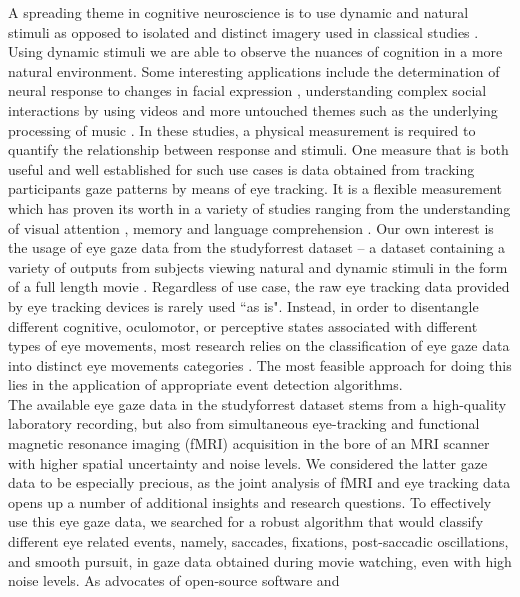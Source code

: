     A spreading theme in cognitive neuroscience is to use dynamic and natural stimuli as opposed to isolated and distinct
    imagery used in classical studies \citep{real_world}. Using dynamic stimuli we are able to observe the nuances of
    cognition in a more natural environment. Some interesting applications include the determination of neural response
    to changes in facial expression \citep{Harris2014}, understanding complex social interactions by using videos
    \citep{Tikka2012} and more untouched themes such as the underlying processing of music \citep{Toiviainen2014}.
    In these studies, a physical measurement is required to quantify the relationship between response and stimuli.
    One measure that is both useful and well established for such use cases is data obtained from tracking
    participants gaze patterns by means of eye tracking. It is a flexible measurement which has proven its worth in a
    variety of studies ranging from the understanding of visual attention \citep{HantaoLiu2011}, memory
    \citep{Hannula2010} and language comprehension \citep{Gordon2006}. Our own interest is the usage of eye gaze data
    from the studyforrest dataset -- a dataset containing a variety of outputs from subjects viewing natural and
    dynamic stimuli in the form of a full length movie \citep{Hanke2016}.
    Regardless of use case, the raw eye tracking data provided by eye tracking devices is rarely used ``as
    is". Instead, in order to disentangle different cognitive, oculomotor, or perceptive states associated with
    different types of eye movements, most research relies on the classification of eye gaze data into distinct eye
    movements categories \citep{Schutz2011}. The most feasible approach for doing this lies in the application of
    appropriate event detection algorithms. \\
    The available eye gaze data in the studyforrest dataset stems from a high-quality laboratory recording, but also
    from simultaneous eye-tracking and functional magnetic resonance imaging (fMRI) acquisition in the bore of an MRI
    scanner with higher spatial uncertainty and noise levels. We considered the latter gaze data to be especially precious,
    as the joint analysis of fMRI and eye tracking data opens up a number of additional insights and research
    questions. To effectively use this eye gaze data, we searched for a robust algorithm that would classify
    different eye related events, namely, saccades, fixations, post-saccadic oscillations, and smooth pursuit, in gaze
    data obtained during movie watching, even with high noise levels. As advocates of open-source software and
